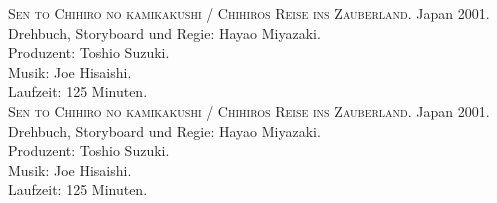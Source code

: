 \documentclass[a4paper]{article}
\begin{document}
\begin{thebibliography}{9}
	\textsc{Sen to Chihiro no kamikakushi / Chihiros Reise ins Zauberland}. Japan 2001. \\
	Drehbuch, Storyboard und Regie: Hayao Miyazaki.\\
	Produzent: Toshio Suzuki. \\
	Musik: Joe Hisaishi. \\
	Laufzeit: 125 Minuten. \\

	\textsc{Sen to Chihiro no kamikakushi / Chihiros Reise ins Zauberland}. Japan 2001. \\
	Drehbuch, Storyboard und Regie: Hayao Miyazaki.\\
	Produzent: Toshio Suzuki. \\
	Musik: Joe Hisaishi. \\
	Laufzeit: 125 Minuten. \\
	
\end{thebibliography}
\end{document}
